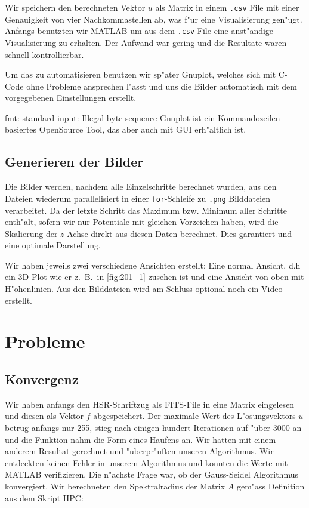 \begin{refsection}
Wir speichern den berechneten Vektor $u$ als Matrix in einem \texttt{.csv}
File mit einer Genauigkeit von vier Nachkommastellen ab, was f"ur
eine Visualisierung gen"ugt. Anfangs benutzten wir MATLAB um aus
dem \texttt{.csv}-File eine anst"andige Visualisierung zu erhalten. Der
Aufwand war gering und die Resultate waren schnell kontrollierbar.
		

		
Um das zu automatisieren benutzen wir sp"ater Gnuplot, welches sich
mit C-Code ohne Probleme ansprechen l"asst und uns die Bilder
automatisch mit dem vorgegebenen Einstellungen erstellt.
		
fmt: standard input: Illegal byte sequence
Gnuplot ist ein Kommandozeilen basiertes OpenSource Tool, das aber
auch mit GUI erh"altlich ist.
		

	
\subsection{Generieren der Bilder}
	
Die Bilder werden, nachdem alle Einzelschritte berechnet wurden, aus
den Dateien wiederum parallelisiert in einer \verb|for|-Schleife
zu \texttt{.png} Bilddateien verarbeitet. Da der letzte Schritt das Maximum
bzw. Minimum aller Schritte enth"alt, sofern wir nur Potentiale mit
gleichen Vorzeichen haben, wird die Skalierung der $z$-Achse direkt
aus diesen Daten berechnet. Dies garantiert und eine optimale
Darstellung.
		
Wir haben jeweils zwei verschiedene Ansichten erstellt: Eine normal
Ansicht, d.h ein 3D-Plot wie er z.~B.~in \ref{fig:201_1} zusehen
ist und eine Ansicht von oben mit H"ohenlinien. Aus den Bilddateien
wird am Schluss optional noch ein Video erstellt.
		
\section{Probleme}

\subsection{Konvergenz}
	
Wir haben anfangs den HSR-Schriftzug als FITS-File in eine Matrix 
eingelesen und diesen als Vektor $f$ abgespeichert. Der maximale
Wert des L"osungsvektors $u$ betrug anfangs nur 255, stieg nach
einigen hundert Iterationen auf "uber 3000 an und die Funktion nahm
die Form eines Haufens an. Wir hatten mit einem anderem Resultat
gerechnet und "uberpr"uften unseren Algorithmus. Wir entdeckten
keinen Fehler in unserem Algorithmus und konnten die Werte mit
MATLAB verifizieren. Die n"achste Frage war, ob der Gauss-Seidel
Algorithmus konvergiert. Wir berechneten den Spektralradius der
Matrix $A$ gem"ass Definition aus dem Skript
HPC\cite{mueller:hpcseminar}:
	

\end{refsection}
